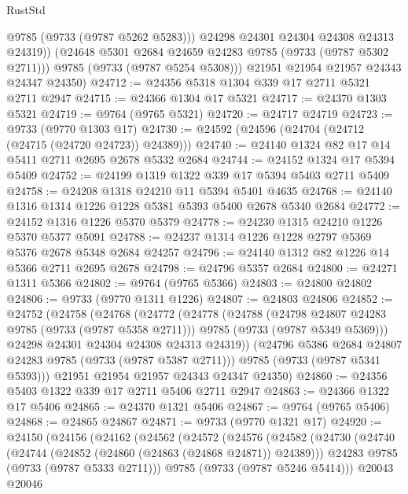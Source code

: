 \begin{lexlean}{RustStd}
\begin{coremodule}
{\begin{coremodule}
{{{{{{{{{{{{{{{{{{{{{{{{{{{{{{{{{{{{{{{{{{{{{{{{{{{{{{{              @9785
              (@9733 (@9787 @5262 @5283)))
            @24298
            @24301
            @24304
            @24308
            @24313
            @24319))
        (@24648 @5301 @2684 @24659 @24283 @9785 (@9733 (@9787 @5302 @2711)))
        @9785
        (@9733 (@9787 @5254 @5308)))
      @21951
      @21954
      @21957
      @24343
      @24347
      @24350)
@24712 := @24356 @5318 @1304 @339 @17 @2711 @5321 @2711 @2947
@24715 := @24366 @1304 @17 @5321
@24717 := @24370 @1303 @5321
@24719 := @9764 (@9765 @5321)
@24720 := @24717 @24719
@24723 := @9733 (@9770 @1303 @17)
@24730 := @24592 (@24596 (@24704 (@24712 (@24715 (@24720 @24723)) @24389)))
@24740 := @24140 @1324 @82 @17 @14 @5411 @2711 @2695 @2678 @5332 @2684
@24744 := @24152 @1324 @17 @5394 @5409
@24752 := @24199 @1319 @1322 @339 @17 @5394 @5403 @2711 @5409
@24758 := @24208 @1318 @24210 @11 @5394 @5401 @4635
@24768 := @24140 @1316 @1314 @1226 @1228 @5381 @5393 @5400 @2678 @5340 @2684
@24772 := @24152 @1316 @1226 @5370 @5379
@24778 := @24230 @1315 @24210 @1226 @5370 @5377 @5091
@24788 := @24237 @1314 @1226 @1228 @2797 @5369 @5376 @2678 @5348 @2684 @24257
@24796 := @24140 @1312 @82 @1226 @14 @5366 @2711 @2695 @2678
@24798 := @24796 @5357 @2684
@24800 := @24271 @1311 @5366
@24802 := @9764 (@9765 @5366)
@24803 := @24800 @24802
@24806 := @9733 (@9770 @1311 @1226)
@24807 := @24803 @24806
@24852 := @24752
    (@24758
      (@24768
        (@24772
          (@24778
            (@24788
              (@24798 @24807 @24283 @9785 (@9733 (@9787 @5358 @2711)))
              @9785
              (@9733 (@9787 @5349 @5369)))
            @24298
            @24301
            @24304
            @24308
            @24313
            @24319))
        (@24796 @5386 @2684 @24807 @24283 @9785 (@9733 (@9787 @5387 @2711)))
        @9785
        (@9733 (@9787 @5341 @5393)))
      @21951
      @21954
      @21957
      @24343
      @24347
      @24350)
@24860 := @24356 @5403 @1322 @339 @17 @2711 @5406 @2711 @2947
@24863 := @24366 @1322 @17 @5406
@24865 := @24370 @1321 @5406
@24867 := @9764 (@9765 @5406)
@24868 := @24865 @24867
@24871 := @9733 (@9770 @1321 @17)
@24920 := @24150
    (@24156
      (@24162
        (@24562
          (@24572
            (@24576
              (@24582
                (@24730
                  (@24740
                    (@24744 (@24852 (@24860 (@24863 (@24868 @24871)) @24389)))
                    @24283
                    @9785
                    (@9733 (@9787 @5333 @2711)))
                  @9785
                  (@9733 (@9787 @5246 @5414)))
                @20043
                @20046
}}}}}}}}}}}}}}}}}}}}}}}}}}}}}}}}}}}}}}}}}}}}}}}}}}}}}}}
\end{coremodule}}
\end{coremodule}
\end{lexlean}
